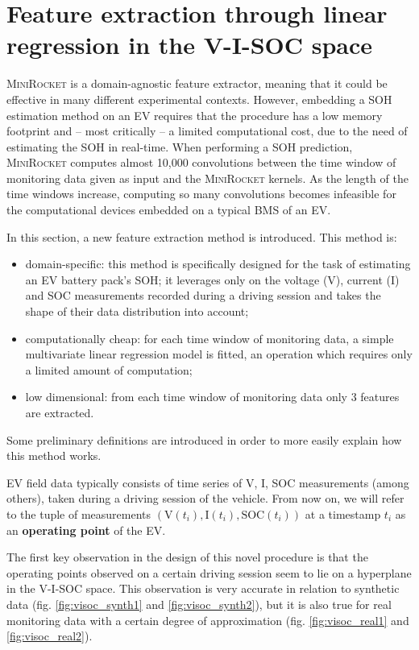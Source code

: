 \section{Feature extraction through linear regression in the V-I-SOC space}
\label{sec:my_method}
\textsc{MiniRocket} is a domain-agnostic feature extractor, meaning that it could be effective in many different experimental contexts. However, embedding a SOH estimation method on an EV requires that the procedure has a low memory footprint and -- most critically --
a limited computational cost, due to the need of estimating the SOH in real-time. When performing a SOH prediction, \textsc{MiniRocket} computes almost 10,000 convolutions between the time window of monitoring data given as input and the \textsc{MiniRocket} kernels. As the length of the time windows increase, computing so many convolutions becomes infeasible for the computational devices embedded on a typical BMS of an EV.

In this section, a new feature extraction method is introduced. This method is:
\begin{itemize}
    \item domain-specific: this method is specifically designed for the task of estimating an EV battery pack's SOH; it leverages only on the voltage (V), current (I) and SOC measurements recorded during a driving session and takes the shape of their data distribution into account;
    \item computationally cheap: for each time window of monitoring data, a simple multivariate linear regression model is fitted, an operation which requires only a limited amount of computation;
    \item low dimensional: from each time window of monitoring data only 3 features are extracted.
\end{itemize}

Some preliminary definitions are introduced in order to more easily explain how this method works.

EV field data typically consists of time series of V, I, SOC measurements (among others), taken during a driving session of the vehicle. From now on, we will refer to the tuple of measurements $(\text{V}(t_i), \text{I}(t_i), \text{SOC}(t_i))$ at a timestamp $t_i$ as an \textbf{operating point} of the EV.

The first key observation in the design of this novel procedure is that the operating points observed on a certain driving session seem to lie on a hyperplane in the V-I-SOC space. This observation is very accurate in relation to synthetic data (fig. \ref{fig:visoc_synth1} and \ref{fig:visoc_synth2}), but it is also true for real monitoring data with a certain degree of approximation (fig. \ref{fig:visoc_real1} and \ref{fig:visoc_real2}).

